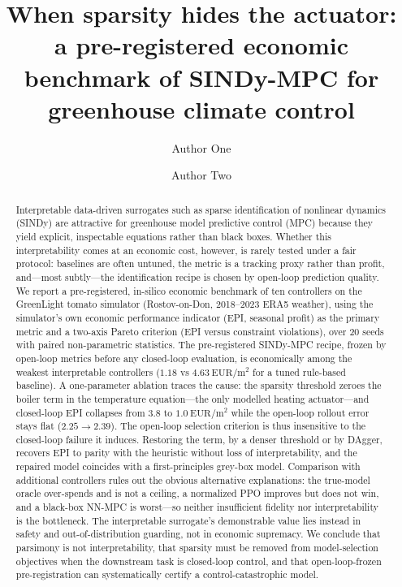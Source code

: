 \documentclass[preprint,3p]{elsarticle}
\begin{document}
\begin{frontmatter}

\title{When sparsity hides the actuator: a pre-registered economic benchmark of
SINDy-MPC for greenhouse climate control}

\author[a]{Author One}
\author[a]{Author Two}

\begin{abstract}
Interpretable data-driven surrogates such as sparse identification of nonlinear
dynamics (SINDy) are attractive for greenhouse model predictive control (MPC)
because they yield explicit, inspectable equations rather than black boxes.
Whether this interpretability comes at an economic cost, however, is rarely tested
under a fair protocol: baselines are often untuned, the metric is a tracking proxy
rather than profit, and---most subtly---the identification recipe is chosen by
open-loop prediction quality. We report a pre-registered, in-silico economic
benchmark of ten controllers on the GreenLight tomato simulator (Rostov-on-Don,
2018--2023 ERA5 weather), using the simulator's own economic performance indicator
(EPI, seasonal profit) as the primary metric and a two-axis Pareto criterion
(EPI versus constraint violations), over 20 seeds with paired non-parametric
statistics. The pre-registered SINDy-MPC recipe, frozen by open-loop metrics
before any closed-loop evaluation, is economically among the weakest interpretable
controllers ($1.18$ vs $4.63~\mathrm{EUR/m^2}$ for a tuned rule-based baseline). A
one-parameter ablation traces the cause: the sparsity threshold zeroes the boiler
term in the temperature equation---the only modelled heating actuator---and
closed-loop EPI collapses from $3.8$ to $1.0~\mathrm{EUR/m^2}$ while the open-loop
rollout error stays flat ($2.25\rightarrow2.39$). The open-loop selection criterion
is thus insensitive to the closed-loop failure it induces. Restoring the term, by a
denser threshold or by DAgger, recovers EPI to parity with the heuristic without
loss of interpretability, and the repaired model coincides with a first-principles
grey-box model. Comparison with additional controllers rules out the obvious
alternative explanations: the true-model oracle over-spends and is not a ceiling, a
normalized PPO improves but does not win, and a black-box NN-MPC is worst---so
neither insufficient fidelity nor interpretability is the bottleneck. The
interpretable surrogate's demonstrable value lies instead in safety and
out-of-distribution guarding, not in economic supremacy. We conclude that parsimony
is not interpretability, that sparsity must be removed from model-selection
objectives when the downstream task is closed-loop control, and that
open-loop-frozen pre-registration can systematically certify a control-catastrophic
model.
\end{abstract}


\end{frontmatter}
\end{document}
